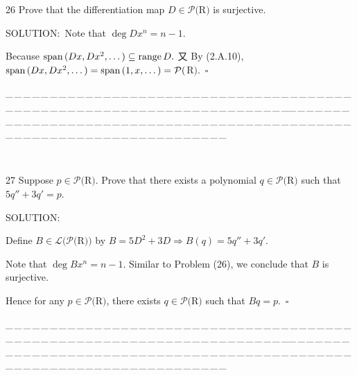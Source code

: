 \documentclass[a4paper, 11pt, UTF8]{article}
\def\range{\textup{range}\,}
\def\Spn{\textup{span}\,}
\def\Lm{\mathcal{L}}
\def\Po{\mathcal{P}}
\begin{document}
\begin{large}
{\timesbf\Large 26} {\timessl\Large 
Prove that the differentiation map $D\in\Po(${\timesbf R}$)$ is surjective.
}\par
{\timesbf S\footnotesize{OLUTION:}}\,\,\,Note that $\deg Dx^n=n-1$.\par\quad
Because $\Spn(Dx,Dx^2,\dots)\subseteq\range D.$ 又 By (2.A.10), $\Spn(Dx,Dx^2,\dots)=\Spn(1,x,\dots)=\Po(${\timesbf R}$).\,\,\,\square$
\par
{\tiny \_\,\_\,\_\,\_\,\_\,\_\,\_\,\_\,\_\,\_\,\_\,\_\,\_\,\_\,\_\,\_\,\_\,\_\,\_\,\_\,\_\,\_\,\_\,\_\,\_\,\_\,\_\,\_\,\_\,\_\,\_\,\_\,\_\,\_\,\_\,\_\,\_\,\_\,\_\,\_\,\_\,\_\,\_\,\_\,\_\,\_\,\_\,\_\,\_\,\_\,\_\,\_\,\_\,\_\,\_\,\_\,\_\,\_\,\_\,\_\,\_\,\_\,\_\,\_\,\_\,\_\,\_\,\_\,\_\,\_\,\_\_\,\_\,\_\,\_\,\_\,\_\,\_\,\_\,\_\,\_\,\_\,\_\,\_\,\_\,\_\,\_\,\_\,\_\,\_\,\_\,\_\,\_\,\_\,\_\,\_\,\_\,\_\,\_\,\_\,\_\,\_\,\_\,\_\,\_\,\_\,\_\,\_\,\_\,\_\,\_\,\_\,\_\,\_\,\_\,\_\,\_\,\_\,\_\,\_\,\_\,\_\,\_\,\_\,\_\,\_\,\_\,\_\,\_\,\_\,\_\,\_\,\_\,\_\,\_\,\_\,\_\,\_\,\_\,\_\,\_\,\_}{\tiny\,\par}

{\timesbf\Large 27} {\timessl\Large 
Suppose $p\in\Po(${\timesbf R}$)$. Prove that there exists a polynomial $q\in\Po(${\timesbf R}$)$ such that $5q'' + 3q' = p$.
}\par
{\timesbf S\footnotesize{OLUTION:}}\par\quad
Define $B\in\Lm(\Po(${\timesbf R}$))$ by $B=5D^2+3D\Rightarrow B(q)=5q''+3q'$.\par\quad
Note that $\deg B x^n=n-1.$ Similar to Problem (26), we conclude that $B$ is surjective.\par\quad
Hence for any $p\in\Po(${\timesbf R}$)$, there exists $q\in\Po(${\timesbf R}$)$ such that $Bq=p.\,\,\,\square$\par
{\tiny \_\,\_\,\_\,\_\,\_\,\_\,\_\,\_\,\_\,\_\,\_\,\_\,\_\,\_\,\_\,\_\,\_\,\_\,\_\,\_\,\_\,\_\,\_\,\_\,\_\,\_\,\_\,\_\,\_\,\_\,\_\,\_\,\_\,\_\,\_\,\_\,\_\,\_\,\_\,\_\,\_\,\_\,\_\,\_\,\_\,\_\,\_\,\_\,\_\,\_\,\_\,\_\,\_\,\_\,\_\,\_\,\_\,\_\,\_\,\_\,\_\,\_\,\_\,\_\,\_\,\_\,\_\,\_\,\_\,\_\,\_\_\,\_\,\_\,\_\,\_\,\_\,\_\,\_\,\_\,\_\,\_\,\_\,\_\,\_\,\_\,\_\,\_\,\_\,\_\,\_\,\_\,\_\,\_\,\_\,\_\,\_\,\_\,\_\,\_\,\_\,\_\,\_\,\_\,\_\,\_\,\_\,\_\,\_\,\_\,\_\,\_\,\_\,\_\,\_\,\_\,\_\,\_\,\_\,\_\,\_\,\_\,\_\,\_\,\_\,\_\,\_\,\_\,\_\,\_\,\_\,\_\,\_\,\_\,\_\,\_\,\_\,\_\,\_\,\_\,\_\,\_}{\tiny\,\par}


\end{large}
\end{document}
